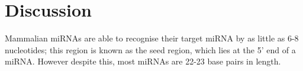 \documentclass{article}
\begin{document}
\section{Discussion}\label{discussion}

Mammalian miRNAs are able to recognise their target miRNA by as little as 6-8 nucleotides; this region is known as the seed region, which lies at the 5' end of a miRNA. However despite this, most miRNAs are 22-23 base pairs in length.

\blindtext

\newpage



\end{document}
